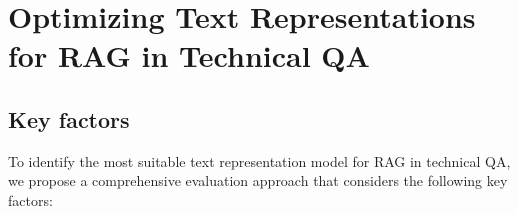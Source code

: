






\section{Optimizing Text Representations for RAG in Technical QA}

\subsection{Key factors}
To identify the most suitable text representation model for \ac{RAG} in technical \ac{QA}, we propose a comprehensive evaluation approach that considers the following key factors:

